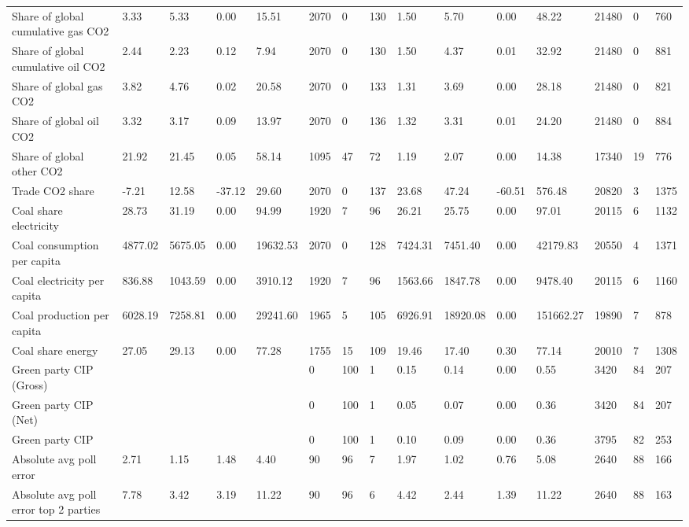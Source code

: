 \begin{longtable}{lllllllllllllll}
Share of global cumulative gas CO2 & 3.33 & 5.33 & 0.00 & 15.51 & 2070 & 0 & 130 & 1.50 & 5.70 & 0.00 & 48.22 & 21480 & 0 & 760\\
\addlinespace
Share of global cumulative oil CO2 & 2.44 & 2.23 & 0.12 & 7.94 & 2070 & 0 & 130 & 1.50 & 4.37 & 0.01 & 32.92 & 21480 & 0 & 881\\
Share of global gas CO2 & 3.82 & 4.76 & 0.02 & 20.58 & 2070 & 0 & 133 & 1.31 & 3.69 & 0.00 & 28.18 & 21480 & 0 & 821\\
Share of global oil CO2 & 3.32 & 3.17 & 0.09 & 13.97 & 2070 & 0 & 136 & 1.32 & 3.31 & 0.01 & 24.20 & 21480 & 0 & 884\\
Share of global other CO2 & 21.92 & 21.45 & 0.05 & 58.14 & 1095 & 47 & 72 & 1.19 & 2.07 & 0.00 & 14.38 & 17340 & 19 & 776\\
Trade CO2 share & -7.21 & 12.58 & -37.12 & 29.60 & 2070 & 0 & 137 & 23.68 & 47.24 & -60.51 & 576.48 & 20820 & 3 & 1375\\
\addlinespace
Coal share electricity & 28.73 & 31.19 & 0.00 & 94.99 & 1920 & 7 & 96 & 26.21 & 25.75 & 0.00 & 97.01 & 20115 & 6 & 1132\\
Coal consumption per capita & 4877.02 & 5675.05 & 0.00 & 19632.53 & 2070 & 0 & 128 & 7424.31 & 7451.40 & 0.00 & 42179.83 & 20550 & 4 & 1371\\
Coal electricity per capita & 836.88 & 1043.59 & 0.00 & 3910.12 & 1920 & 7 & 96 & 1563.66 & 1847.78 & 0.00 & 9478.40 & 20115 & 6 & 1160\\
Coal production per capita & 6028.19 & 7258.81 & 0.00 & 29241.60 & 1965 & 5 & 105 & 6926.91 & 18920.08 & 0.00 & 151662.27 & 19890 & 7 & 878\\
Coal share energy & 27.05 & 29.13 & 0.00 & 77.28 & 1755 & 15 & 109 & 19.46 & 17.40 & 0.30 & 77.14 & 20010 & 7 & 1308\\
\addlinespace
Green party CIP (Gross) &  &  &  &  & 0 & 100 & 1 & 0.15 & 0.14 & 0.00 & 0.55 & 3420 & 84 & 207\\
Green party CIP (Net) &  &  &  &  & 0 & 100 & 1 & 0.05 & 0.07 & 0.00 & 0.36 & 3420 & 84 & 207\\
Green party CIP &  &  &  &  & 0 & 100 & 1 & 0.10 & 0.09 & 0.00 & 0.36 & 3795 & 82 & 253\\
Absolute avg poll error & 2.71 & 1.15 & 1.48 & 4.40 & 90 & 96 & 7 & 1.97 & 1.02 & 0.76 & 5.08 & 2640 & 88 & 166\\
Absolute avg poll error top 2 parties & 7.78 & 3.42 & 3.19 & 11.22 & 90 & 96 & 6 & 4.42 & 2.44 & 1.39 & 11.22 & 2640 & 88 & 163\\

\end{longtable}
